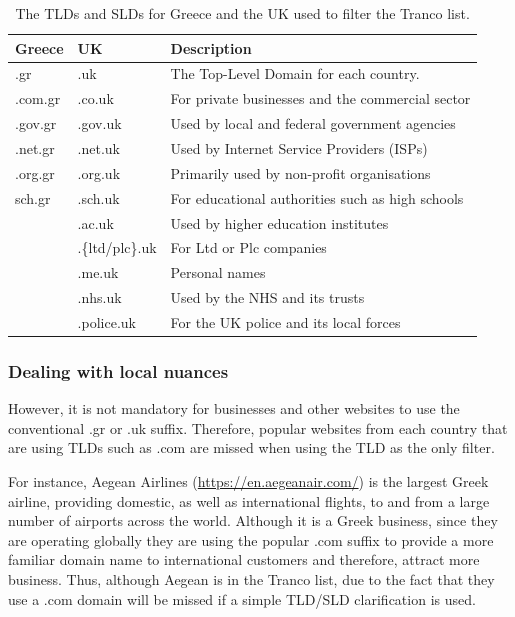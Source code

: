 \documentclass[../main.tex]{subfiles}
\begin{document}
\begin{table}[ht]
\centering
\begin{tabular}{@{}lll@{}}
\toprule
\textbf{Greece} & \textbf{UK}     & \textbf{Description}                                     \\ \midrule
.gr             & .uk             & The Top-Level Domain for each country.                   \\
.com.gr         & .co.uk          & For private businesses and the commercial sector         \\
.gov.gr         & .gov.uk         & Used by local and federal government agencies            \\
.net.gr         & .net.uk         & Used by Internet Service Providers (ISPs)                \\
.org.gr         & .org.uk         & Primarily used by non-profit organisations               \\
sch.gr          & .sch.uk         & For educational authorities such as high schools         \\
                & .ac.uk          & Used by higher education institutes                      \\
                & .\{ltd/plc\}.uk & For Ltd or Plc companies                                 \\
                & .me.uk          & Personal names                                           \\
                & .nhs.uk         & Used by the NHS and its trusts                           \\
                & .police.uk      & For the UK police and its local forces                   \\ \bottomrule
\end{tabular}
\caption{The TLDs and SLDs for Greece \cite{gr_registar} and the UK \cite{nominet_additional_domains, nominet_rules} used to filter the Tranco list.}
\label{tab:impl_tlds}
\end{table}

\subsubsection{Dealing with local nuances}
However, it is not mandatory for businesses and other websites to use the conventional .gr or .uk suffix. Therefore, popular websites from each country that are using TLDs such as .com are missed when using the TLD as the only filter. 

For instance, Aegean Airlines (\url{https://en.aegeanair.com/}) is the largest Greek airline, providing domestic, as well as international flights, to and from a large number of airports across the world. Although it is a Greek business, since they are operating globally they are using the popular .com suffix to provide a more familiar domain name to international customers and therefore, attract more business. Thus, although Aegean is in the Tranco list, due to the fact that they use a .com domain will be missed if a simple TLD/SLD clarification is used.
\end{document}
